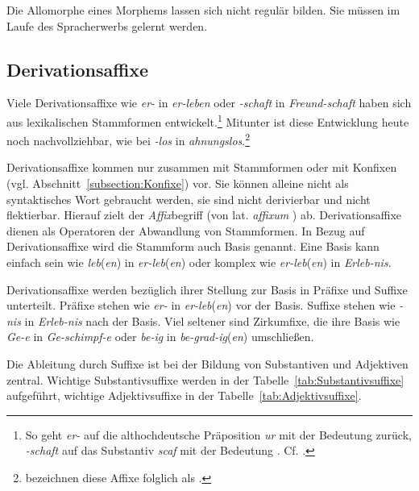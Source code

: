 Die Allomorphe eines Morphems lassen sich nicht regulär bilden. Sie müssen im Laufe des Spracherwerbs gelernt werden. 

\subsection{Derivationsaffixe}\label{subsection:Derivationsaffixe}

Viele Derivationsaffixe wie \textit{er-} in \textit{er-leben} oder \textit{-schaft} in \textit{Freund-schaft} haben sich aus lexikalischen Stammformen entwickelt.\footnote{So geht \textit{er-} auf die althochdeutsche Präposition \textit{ur} mit der Bedeutung  zurück, \textit{-schaft} auf das Substantiv \textit{scaf} mit der Bedeutung . Cf. \citet[387]{Wilmanns1896Wb}.} Mitunter ist diese Entwicklung heute noch nachvollziehbar, wie bei \textit{-los} in \textit{ahnungslos}.\footnote{\citet[151]{EisenbergSayatz2002} bezeichnen diese Affixe folglich als .}

Derivationsaffixe kommen nur zusammen mit Stammformen oder mit Konfixen (vgl. Abschnitt~\ref{subsection:Konfixe}) vor. Sie können alleine nicht als syntaktisches Wort gebraucht werden, sie sind nicht derivierbar und nicht flektierbar. Hierauf zielt der \textit{Affix}begriff (von lat. \textit{affixum} ) ab. Derivationsaffixe dienen als Operatoren der Abwandlung von Stammformen. In Bezug auf Derivationsaffixe wird die Stammform auch Basis genannt. Eine Basis kann einfach sein wie \textit{leb}(\textit{en}) in \textit{er-leb}(\textit{en}) oder komplex wie \textit{er-leb}(\textit{en}) in \textit{Erleb-nis}.   

Derivationsaffixe werden bezüglich ihrer Stellung zur Basis in Präfixe und Suffixe unterteilt. Präfixe stehen wie \textit{er-} in \textit{er-leb}(\textit{en}) vor der Basis. Suffixe stehen wie \textit{-nis} in \textit{Erleb-nis} nach der Basis. Viel seltener sind Zirkumfixe, die ihre Basis wie \textit{Ge-e} in \textit{Ge-schimpf-e} oder \textit{be-ig} in \textit{be-grad-ig}(\textit{en}) umschließen. 

Die Ableitung durch Suffixe ist bei der Bildung von Substantiven und Adjektiven zentral. Wichtige Substantivsuffixe werden in der Tabelle~\ref{tab:Substantivsuffixe} aufgeführt, wichtige Adjektivsuffixe in der Tabelle~\ref{tab:Adjektivsuffixe}.

